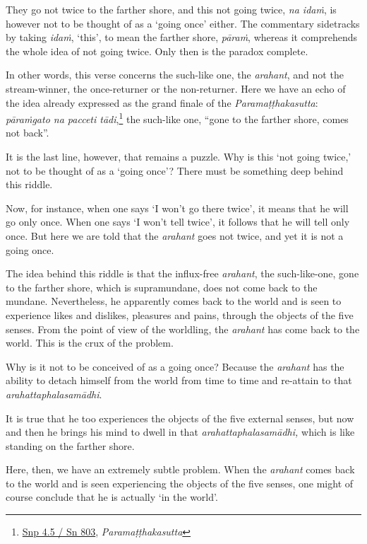 They go not twice to the farther shore, and this not going twice, \emph{na idaṁ}, is however not to be thought of as a `going once' either. The commentary sidetracks by taking \emph{idaṁ}, `this', to mean the farther shore, \emph{pāraṁ}, whereas it comprehends the whole idea of not going twice. Only then is the paradox complete.

In other words, this verse concerns the such-like one, the \emph{arahant}, and not the stream-winner, the once-returner or the non-returner. Here we have an echo of the idea already expressed as the grand finale of the \emph{Paramaṭṭhakasutta}: \emph{pāraṁgato na pacceti tādi},\footnote{\href{https://suttacentral.net/snp4.5/pli/ms}{Snp 4.5 / Sn 803}, \emph{Paramaṭṭhakasutta}} the such-like one, ``gone to the farther shore, comes not back''.

It is the last line, however, that remains a puzzle. Why is this `not going twice,' not to be thought of as a `going once'? There must be something deep behind this riddle.

Now, for instance, when one says `I won't go there twice', it means that he will go only once. When one says `I won't tell twice', it follows that he will tell only once. But here we are told that the \emph{arahant} goes not twice, and yet it is not a going once.

The idea behind this riddle is that the influx-free \emph{arahant}, the such-like-one, gone to the farther shore, which is supramundane, does not come back to the mundane. Nevertheless, he apparently comes back to the world and is seen to experience likes and dislikes, pleasures and pains, through the objects of the five senses. From the point of view of the worldling, the \emph{arahant} has come back to the world. This is the crux of the problem.

Why is it not to be conceived of as a going once? Because the \emph{arahant} has the ability to detach himself from the world from time to time and re-attain to that \emph{arahattaphalasamādhi}.

It is true that he too experiences the objects of the five external senses, but now and then he brings his mind to dwell in that \emph{arahattaphalasamādhi,} which is like standing on the farther shore.

Here, then, we have an extremely subtle problem. When the \emph{arahant} comes back to the world and is seen experiencing the objects of the five senses, one might of course conclude that he is actually `in the world'.


